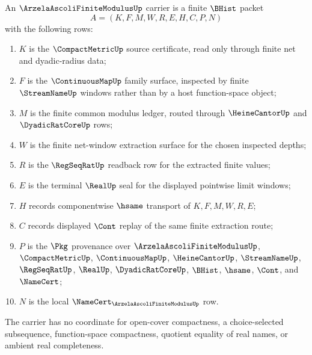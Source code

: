 \begin{definition}
\label{def:arzela-ascoli-finite-modulus-carrier}
An $\ArzelaAscoliFiniteModulusUp$ carrier is a finite $\BHist$ packet
$$
A=(K,F,M,W,R,E,H,C,P,N)
$$
with the following rows:
\begin{enumerate}
\item $K$ is the $\CompactMetricUp$ source certificate, read only through finite net and dyadic-radius data;
\item $F$ is the $\ContinuousMapUp$ family surface, inspected by finite $\StreamNameUp$ windows rather than by a host function-space object;
\item $M$ is the finite common modulus ledger, routed through $\HeineCantorUp$ and $\DyadicRatCoreUp$ rows;
\item $W$ is the finite net-window extraction surface for the chosen inspected depths;
\item $R$ is the $\RegSeqRatUp$ readback row for the extracted finite values;
\item $E$ is the terminal $\RealUp$ seal for the displayed pointwise limit windows;
\item $H$ records componentwise $\hsame$ transport of $K,F,M,W,R,E$;
\item $C$ records displayed $\Cont$ replay of the same finite extraction route;
\item $P$ is the $\Pkg$ provenance over $\ArzelaAscoliFiniteModulusUp$, $\CompactMetricUp$, $\ContinuousMapUp$, $\HeineCantorUp$, $\StreamNameUp$, $\RegSeqRatUp$, $\RealUp$, $\DyadicRatCoreUp$, $\BHist$, $\hsame$, $\Cont$, and $\NameCert$;
\item $N$ is the local $\NameCert_{\ArzelaAscoliFiniteModulusUp}$ row.
\end{enumerate}
The carrier has no coordinate for open-cover compactness, a choice-selected subsequence, function-space compactness, quotient equality of real names, or ambient real completeness.
\end{definition}

